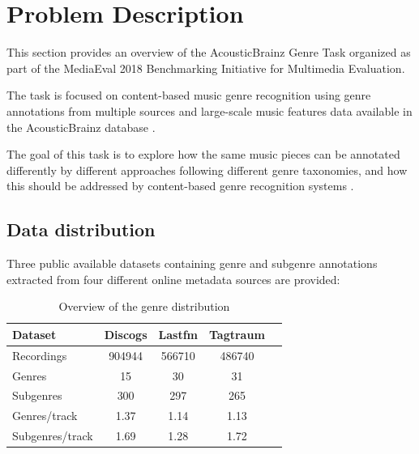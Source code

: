 
\chapter{Problem Description}

\label{problemdescription}

This section provides an overview of the AcousticBrainz Genre Task
organized as part of the MediaEval 2018 Benchmarking Initiative for
Multimedia Evaluation. 

The task is focused on content-based music genre recognition using genre annotations from multiple sources
and large-scale music features data available in the AcousticBrainz
database \cite{Porter2015}. 

The goal of this task is to explore how the same music
pieces can be annotated differently by different approaches following different genre taxonomies, and how this should be addressed
by content-based genre recognition systems \cite{Bogdanov2018}. 


\section{Data distribution}

Three public available datasets containing genre and subgenre annotations extracted from four different online metadata sources are provided:

\begin{table}[!htb]
    \centering
    \begin{tabular}{l c c c c} 
        \hline
        Dataset & Discogs & Lastfm & Tagtraum \\ [0.5ex] 
        \hline
        Recordings & 904944 & 566710 & 486740 \\ 
        Genres & 15 & 30 & 31 \\
        Subgenres & 300 & 297 & 265 \\
        Genres/track  & 1.37 & 1.14 & 1.13 \\
        Subgenres/track & 1.69 & 1.28 & 1.72 \\
        \hline
    \end{tabular}
    \caption{Overview of the genre distribution}
    \label{table:genredist}
\end{table}

